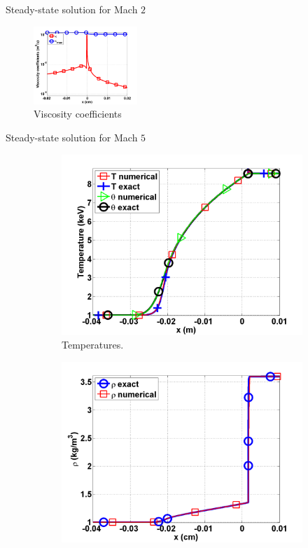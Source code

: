 \documentclass[xcolor=dvipsnames,10pt]{beamer}
\begin{document}
\begin{frame}{Steady-state solution for Mach $2$}
\begin{figure}
                \centering
                \includegraphics[width=0.35\textwidth]{../figures/Mach_2_nel_2000_viscosity.png}
        \caption{Viscosity coefficients}
\end{figure}
\end{frame}
\begin{frame}{Steady-state solution for Mach $5$}
\begin{figure}
\begin{subfigure}[b]{0.35\textwidth}
                \centering
                \includegraphics[width=\textwidth]{../figures/Mach_5_nel_1000_temperature.png}
        \caption{Temperatures.}
\end{subfigure}
\begin{subfigure}[b]{0.35\textwidth}
                \centering
                \includegraphics[width=\textwidth]{../figures/Mach_5_nel_2000_density.png}

\end{subfigure}
\end{figure}
\end{frame}
\end{document}

